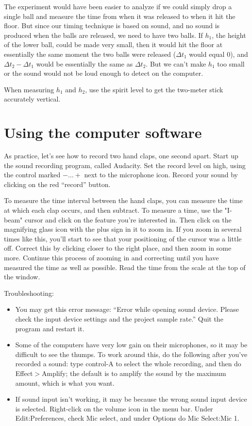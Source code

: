 The experiment would have been easier to analyze if we could
simply drop a single ball and measure the time from when it
was released to when it hit the floor.  But since our timing
technique is based on sound, and no sound is produced when
the balls are released, we need to have two balls.  If
$h_1$, the height of the lower ball, could be made very
small, then it would hit the floor at essentially the same
moment the two balls were released ($\Delta t_1$ would equal 0),
and $\Delta t_2-\Delta t_1$ would be essentially the same as $\Delta t_2$.  But
we can't make $h_1$ too small or the sound would not be loud
enough to detect on the computer.

When measuring $h_1$ and $h_2$, use the spirit level to get the
two-meter stick accurately vertical.

\section*{Using the computer software}

As practice, let's see how to record two hand claps, one second apart.
Start up the sound recording program, called Audacity.
Set the record level on high, using the control marked $-\ldots +$ next to
the microphone icon. Record your sound by clicking on the red ``record'' button.


To measure the time interval between the hand claps, you can measure the time at which
each clap occurs, and then subtract. To measure a time, 
use the "I-beam" cursor and click on the feature you're interested in.
Then click on the magnifying glass icon with the plus sign in it to zoom in.
If you zoom in several times like this, you'll start to see that your positioning
of the cursor was a little off. Correct this by clicking closer to the right place,
and then zoom in some more. Continue this process of zooming in and correcting
until you have measured the time as well as possible.
Read the time from the scale at the top of the window.

Troubleshooting:
\begin{itemize}
\item[] You may get this error message: ``Error while opening sound device. Please check the input device settings and the project sample rate.''
Quit the program and restart it.

\item[] Some of the computers have very low gain on their microphones, so it may be difficult to see the thumps. To work around
this, do the following after you've recorded a sound: type control-A to select the whole recording,
and then do Effect$>$Amplify; the default is to amplify the sound by the maximum amount, which is what you want.

\item[] If sound input isn't working, it may be because the wrong sound input device is selected. Right-click on the volume icon
in the menu bar. Under Edit:Preferences, check Mic select, and under Options do Mic Select:Mic 1.
\end{itemize}

